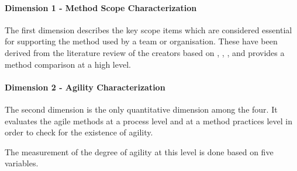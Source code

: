 \paragraph{Dimension 1 - Method Scope Characterization}
The first dimension describes the key scope items which are considered essential for supporting the method used by a team or organisation. These have been derived from the literature review of the creators based on \citet{Beck:2004:EPE:1076267}, \citet{koch2005agile}, \citet{Palmer:2001:PGF:600044}, \citet{Highsmith:2000:ASD:323922} and provides a method comparison at a high level.



%

\paragraph{Dimension 2 - Agility Characterization}
The second dimension is the only quantitative dimension among the four.  It evaluates the agile methods at a process level and at a method practices level in order to check for the existence of agility.

The measurement of the degree of agility at this level is done based on five variables. %

